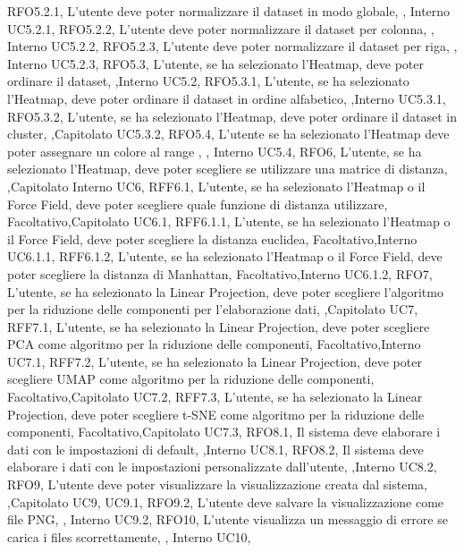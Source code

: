 {    {RFO5.2.1, L'utente deve poter normalizzare il dataset in modo globale, \obb, Interno UC5.2.1},
    {RFO5.2.2, L'utente deve poter normalizzare il dataset per colonna, \obb, Interno UC5.2.2},
    {RFO5.2.3, L'utente deve poter normalizzare il dataset per riga, \obb, Interno UC5.2.3},
    {RFO5.3, L'utente{,} se ha selezionato l'Heatmap{,} deve poter ordinare il dataset, \obb,Interno UC5.2},
    {RFO5.3.1, L'utente{,} se ha selezionato l'Heatmap{,} deve poter ordinare il dataset in ordine alfabetico, \obb,Interno UC5.3.1},
    {RFO5.3.2, L'utente{,} se ha selezionato l'Heatmap{,} deve poter ordinare il dataset in cluster, \obb,Capitolato UC5.3.2},
    {RFO5.4, L'utente se ha selezionato l'Heatmap deve poter assegnare un colore al range , \obb, Interno UC5.4},
    {RFO6, L'utente{,} se ha selezionato l'Heatmap{,} deve poter scegliere se utilizzare una matrice di distanza, \obb,Capitolato Interno UC6},
    {RFF6.1, L'utente{,} se ha selezionato l'Heatmap o il Force Field{,} deve poter scegliere quale funzione di distanza utilizzare, Facoltativo,Capitolato UC6.1},
    {RFF6.1.1, L'utente{,} se ha selezionato l'Heatmap o il Force Field{,} deve poter scegliere la distanza euclidea, Facoltativo,Interno UC6.1.1},
    {RFF6.1.2, L'utente{,} se ha selezionato l'Heatmap o il Force Field{,} deve poter scegliere la distanza di Manhattan, Facoltativo,Interno UC6.1.2},
    {RFO7, L'utente{,} se ha selezionato la Linear Projection{,} deve poter scegliere l'algoritmo per la riduzione delle componenti per l'elaborazione dati, \obb,Capitolato UC7},
    {RFF7.1, L'utente{,} se ha selezionato la Linear Projection{,} deve poter scegliere PCA come algoritmo per la riduzione delle componenti, Facoltativo,Interno UC7.1},
    {RFF7.2, L'utente{,} se ha selezionato la Linear Projection{,} deve poter scegliere UMAP come algoritmo per la riduzione delle componenti, Facoltativo,Capitolato UC7.2},
    {RFF7.3, L'utente{,} se ha selezionato la Linear Projection{,} deve poter scegliere t-SNE come algoritmo per la riduzione delle componenti, Facoltativo,Capitolato UC7.3},
    {RFO8.1, Il sistema deve elaborare i dati con le impostazioni di default, \obb,Interno UC8.1},
    {RFO8.2, Il sistema deve elaborare i dati con le impostazioni personalizzate dall'utente, \obb,Interno UC8.2},
    {RFO9, L'utente deve poter visualizzare la visualizzazione creata dal sistema, \obb,Capitolato UC9{,} UC9.1},
    {RFO9.2, L'utente deve salvare la visualizzazione come file PNG, \obb, Interno UC9.2},
    {RFO10, L'utente visualizza un messaggio di errore se carica i files scorrettamente, \obb, Interno UC10},
}






